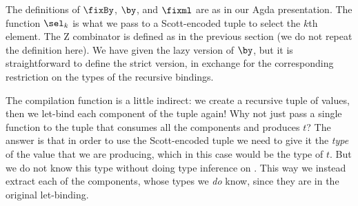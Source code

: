 \noindent The definitions of $\fixBy$, $\by$, and $\fixml$ are as in our
Agda presentation. The function $\selk{k}$ is what we pass to a Scott-encoded
tuple to select the $k$th element. The Z combinator is defined as in the
previous section (we do not repeat the definition here). We have given the lazy version of $\by$, but it is
straightforward to define the strict version, in exchange for the corresponding
restriction on the types of the recursive bindings.

The compilation function is a little indirect: we create a recursive tuple of
values, then we let-bind each component of the tuple again! Why not just pass a
single function to the tuple that consumes all the components and produces $t$? The answer
is that in order to use the Scott-encoded tuple we need to give it the
\emph{type} of the value that we are producing, which in this case would be the
type of $t$. But we do not know this type without doing type inference
on \FIR{}. This way we instead extract each of the
components, whose types we \emph{do} know, since they are in the original let-binding.
